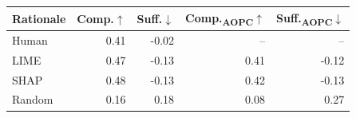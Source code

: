 \begin{tabular}{lrrrr}
\toprule
Rationale & Comp.$\uparrow$ & Suff.$\downarrow$ & Comp.\textsubscript{AOPC}$\uparrow$ & Suff.\textsubscript{AOPC}$\downarrow$ \\
\midrule
Human & 0.41 & -0.02 & -- & -- \\
LIME & 0.47 & -0.13 & 0.41 & -0.12 \\
SHAP & 0.48 & -0.13 & 0.42 & -0.13 \\
Random & 0.16 & 0.18 & 0.08 & 0.27 \\
\bottomrule
\end{tabular}
